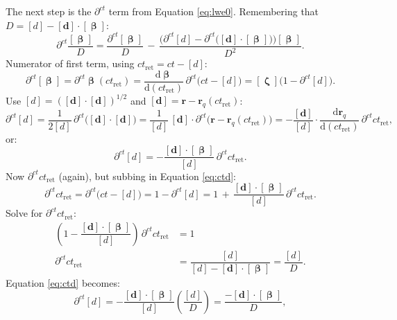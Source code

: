 \documentclass[12pt]{article}
\renewcommand{\vv}[1]{\mathbf{#1}}
\newcommand{\dd}[1]{\mathrm{d}#1}
\newcommand{\vvbeta}{\bm{\upbeta}}
\newcommand{\vvzeta}{\bm{\upzeta}}
\begin{document}
The next step is the $\partial^{ct}$ term from Equation \ref{eq:lwe0}. Remembering that ${D = [d] - [\vv d] \cdot [\vvbeta]}$:
\begin{equation}\label{eq:ctofapart}
\partial^{ct} \dfrac{[\vvbeta]}{D} = \dfrac{\partial^{ct} [\vvbeta]}{D} \, - \, \dfrac{\Big( \partial^{ct} [d] - \partial^{ct} \big( [\vv d] \cdot [\vvbeta] \big) \Big) [\vvbeta] }{D^2} .
\end{equation}
Numerator of first term, using $ct_{\mathrm{ret}} = ct - [d]$:
\begin{equation}\label{eq:firsttermnumerator}
\partial^{ct} [\vvbeta] = \partial^{ct} \vvbeta (ct_{\mathrm{ret}}) = \dfrac{\dd \vvbeta}{\dd (ct_{\mathrm{ret}})} \, \partial^{ct} \big( ct - [d] \big) = [\vvzeta] \big( 1 - \partial^{ct} [d] \big) .
\end{equation}
Use $[d] = ([\vv d] \cdot [\vv d])^{1/2}$ and $[\vv d] = \vv r - \vv r_q (ct_{\mathrm{ret}})$:
\begin{equation*}
\partial^{ct} [d] = \dfrac{1}{2[d]} \, \partial^{ct} \big( [\vv d] \cdot [\vv d] \big) = \dfrac{1}{[d]} \, [\vv d] \cdot \partial^{ct} \big( \vv r - \vv r_q (ct_{\mathrm{ret}}) \big) = - \dfrac{[\vv d]}{[d]} \cdot \dfrac{\dd \vv r_q}{\dd (ct_{\mathrm{ret}})} \, \partial^{ct} ct_{\mathrm{ret}} ,
\end{equation*}
or:
\begin{equation}\label{eq:ctd}
\partial^{ct} [d] = - \dfrac{[\vv d] \cdot [\vvbeta]}{[d]} \, \partial^{ct} ct_{\mathrm{ret}} .
\end{equation}
Now $\partial^{ct} ct_{\mathrm{ret}}$ (again), but subbing in Equation \ref{eq:ctd}:
\begin{equation*}
\partial^{ct} ct_{\mathrm{ret}} = \partial^{ct} \big( ct - [d] \big) = 1 - \partial^{ct} [d] = 1 \, + \, \dfrac{[\vv d] \cdot [\vvbeta]}{[d]} \, \partial^{ct} ct_{\mathrm{ret}} .
\end{equation*}
Solve for $\partial^{ct} ct_{\mathrm{ret}}$:
\begin{equation}\label{eq:ctctret}
\begin{split}
\left( 1 - \dfrac{[\vv d] \cdot [\vvbeta]}{[d]} \right) \, \partial^{ct} ct_{\mathrm{ret}} &= 1 \\
\partial^{ct} ct_{\mathrm{ret}} &= \dfrac{[d]}{[d] - [\vv d] \cdot [\vvbeta]} = \dfrac{[d]}{D}.
\end{split}
\end{equation}
Equation \ref{eq:ctd} becomes:
\begin{equation}\label{eq:ctd2}
\partial^{ct} [d] = - \dfrac{[\vv d] \cdot [\vvbeta]}{[d]} \left( \dfrac{[d]}{D} \right) = \dfrac{- [\vv d] \cdot [\vvbeta]}{D} ,
\end{equation}
\end{document}
